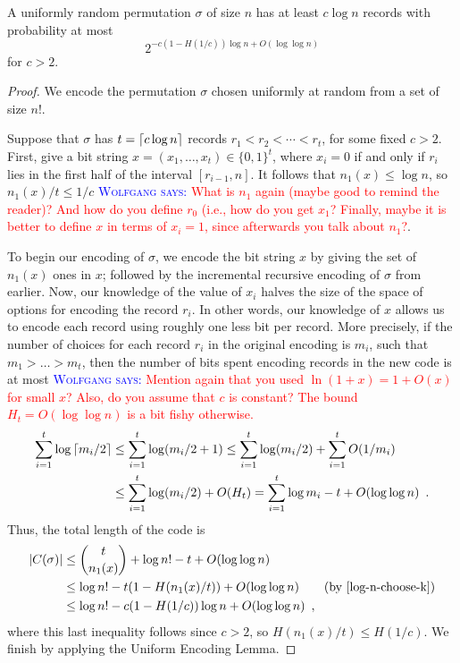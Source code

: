 \documentclass{patmorin}
\newcommand{\aremark}[3]{\textcolor{blue}{\textsc{#1 #2:}}
  \textcolor{red}{\textsf{#3}}}
\newcommand{\wolfgang}[2][says]{\aremark{Wolfgang}{#1}{#2}}
\begin{document}
\begin{thm}
  A uniformly random permutation $\sigma$ of size $n$ has at least $c
  \log n$ records with probability at most
  \[
    2^{-c (1 - H(1/c)) \log n + O(\log \log n)}
  \]
  for $c > 2$.
\end{thm}
\begin{proof}
  We encode the permutation $\sigma$ chosen uniformly at random from a
  set of size $n!$.

  Suppose that $\sigma$ has $t = {\lceil c\log n \rceil}$ records
  $r_1 < r_2 < \cdots < r_t$, for some fixed $c > 2$. First, give a
  bit string $x = (x_1, \dots, x_t) \in \{0, 1\}^t$, where $x_i = 0$
  if and only if $r_i$ lies in the first half of the interval
  $[r_{i - 1}, n]$. It follows that $n_1(x) \leq \log n$, so
  $n_1(x)/t \leq 1/c$ \wolfgang{What is $n_1$ again (maybe good
  to remind the reader)? And how
  do you define $r_0$ (i.e., how do you get $x_1$?
  Finally, maybe it is better to define $x$ in terms of
  $x_i = 1$, since afterwards you talk about $n_1$?}.

  To begin our encoding of $\sigma$, we encode the bit string $x$ by
  giving the set of $n_1(x)$ ones in $x$; followed by the incremental
  recursive encoding of $\sigma$ from earlier. Now, our knowledge of
  the value of $x_i$ halves the size of the space of options for
  encoding the record $r_i$. In other words, our knowledge of $x$
  allows us to encode each record using roughly one less bit per
  record. More precisely, if the number of choices for each record
  $r_i$ in the original encoding is $m_i$, such that $m_1 > \dots >
  m_t$, then the number of bits spent encoding records in the new code
  is at most \wolfgang{Mention again that you used $\ln (1+x) = 1 + O(x)$
  for small $x$? Also, do you assume that $c$ is constant? The
  bound $H_t = O(\log\log n)$ is a bit fishy otherwise.}
  \begin{align*}
    \sum_{i = 1}^t \log {\lceil m_i/2 \rceil} &\leq \sum_{i = 1}^t \log (m_i/2
    + 1)
    \leq \sum_{i = 1}^t \log (m_i/2) + \sum_{i = 1}^t O(1/m_i) \\
    &\leq \sum_{i = 1}^t \log (m_i/2) + O(H_t) = \sum_{i = 1}^t \log
    m_i - t + O(\log \log n) \enspace .
  \end{align*}
  Thus, the total length of the code is
  \begin{align*}
    |C(\sigma)| &\leq \binom{t}{n_1(x)} + \log n! - t + O(\log \log n) \\
                &\leq \log n! - t (1 - H(n_1(x)/t)) + O(\log \log n) \tag{by \eqref{log-n-choose-k}}\\
                &\leq \log n! - c (1 - H(1/c))\log n + O(\log \log n) \enspace ,
  \end{align*}
  where this last inequality follows since $c > 2$, so $H(n_1(x)/t)
  \leq H(1/c)$. We finish by applying the Uniform Encoding Lemma.
\end{proof}
\end{document}
